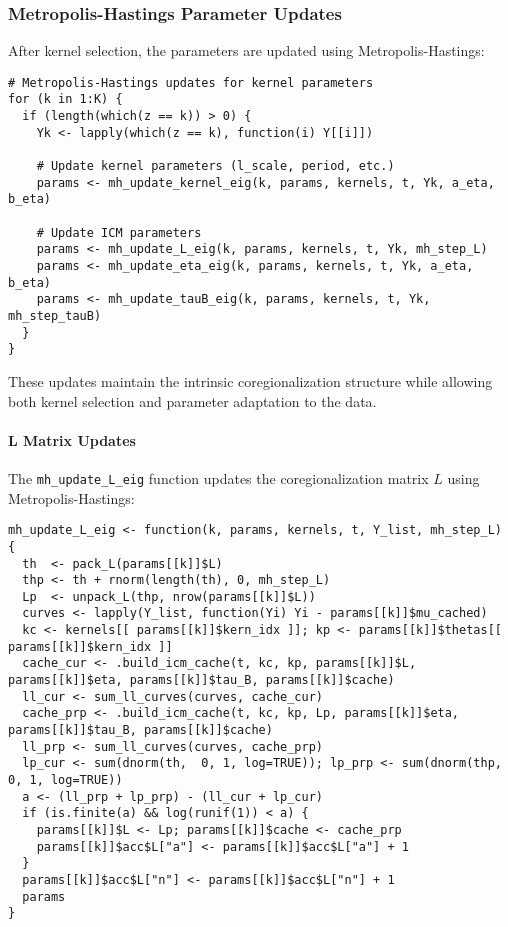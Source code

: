 \documentclass[11pt]{article}
\begin{document}
\subsubsection{Metropolis-Hastings Parameter Updates}

After kernel selection, the parameters are updated using Metropolis-Hastings:

\begin{lstlisting}
# Metropolis-Hastings updates for kernel parameters
for (k in 1:K) {
  if (length(which(z == k)) > 0) {
    Yk <- lapply(which(z == k), function(i) Y[[i]])
    
    # Update kernel parameters (l_scale, period, etc.)
    params <- mh_update_kernel_eig(k, params, kernels, t, Yk, a_eta, b_eta)
    
    # Update ICM parameters
    params <- mh_update_L_eig(k, params, kernels, t, Yk, mh_step_L)
    params <- mh_update_eta_eig(k, params, kernels, t, Yk, a_eta, b_eta)
    params <- mh_update_tauB_eig(k, params, kernels, t, Yk, mh_step_tauB)
  }
}
\end{lstlisting}

These updates maintain the intrinsic coregionalization structure while allowing both kernel selection and parameter adaptation to the data.

\paragraph{L Matrix Updates}

The \texttt{mh\_update\_L\_eig} function updates the coregionalization matrix $L$ using Metropolis-Hastings:

\begin{lstlisting}
mh_update_L_eig <- function(k, params, kernels, t, Y_list, mh_step_L) {
  th  <- pack_L(params[[k]]$L)
  thp <- th + rnorm(length(th), 0, mh_step_L)
  Lp  <- unpack_L(thp, nrow(params[[k]]$L))
  curves <- lapply(Y_list, function(Yi) Yi - params[[k]]$mu_cached)
  kc <- kernels[[ params[[k]]$kern_idx ]]; kp <- params[[k]]$thetas[[ params[[k]]$kern_idx ]]
  cache_cur <- .build_icm_cache(t, kc, kp, params[[k]]$L, params[[k]]$eta, params[[k]]$tau_B, params[[k]]$cache)
  ll_cur <- sum_ll_curves(curves, cache_cur)
  cache_prp <- .build_icm_cache(t, kc, kp, Lp, params[[k]]$eta, params[[k]]$tau_B, params[[k]]$cache)
  ll_prp <- sum_ll_curves(curves, cache_prp)
  lp_cur <- sum(dnorm(th,  0, 1, log=TRUE)); lp_prp <- sum(dnorm(thp, 0, 1, log=TRUE))
  a <- (ll_prp + lp_prp) - (ll_cur + lp_cur)
  if (is.finite(a) && log(runif(1)) < a) {
    params[[k]]$L <- Lp; params[[k]]$cache <- cache_prp
    params[[k]]$acc$L["a"] <- params[[k]]$acc$L["a"] + 1
  }
  params[[k]]$acc$L["n"] <- params[[k]]$acc$L["n"] + 1
  params
}
\end{lstlisting}
\end{document}
